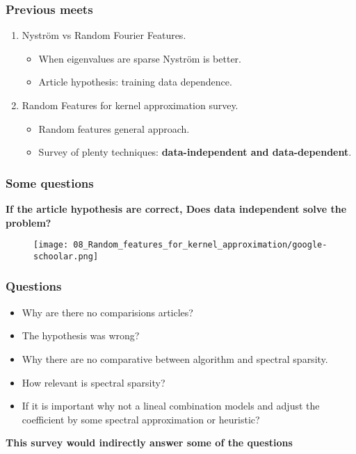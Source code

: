 
\begin{frame}
  \frametitle{Previous meets}
\begin{enumerate}
  \item Nyström vs Random Fourier Features. 
  \begin{itemize}
    \item When eigenvalues  are sparse Nyström is better. 
    \item Article hypothesis: training data dependence. 
  \end{itemize}
  \item Random Features for kernel approximation survey. 
  \begin{itemize}
    \item Random features general approach.
    \item Survey of plenty techniques: \textbf{data-independent and data-dependent}.
  \end{itemize}
\end{enumerate}
\end{frame}

\begin{frame}
  \frametitle{Some questions}
\textbf{If the article hypothesis are correct, Does data independent solve the problem?}

\begin{figure}[t]
  \texttt{[image: 08\_Random\_features\_for\_kernel\_approximation/google-schoolar.png]}
  \centering
\end{figure}
  
\end{frame}

\begin{frame}
  \frametitle{Questions}
\begin{itemize}
  \item Why are there no comparisions articles? 
  \item The hypothesis was wrong?
  \item Why there are no comparative between algorithm and spectral sparsity. 
  \item How relevant is spectral sparsity?
  \item If it is important why not a lineal combination models and adjust the coefficient by some spectral approximation or heuristic?
\end{itemize}

\textbf{This survey would indirectly answer some of the questions }

\end{frame}

